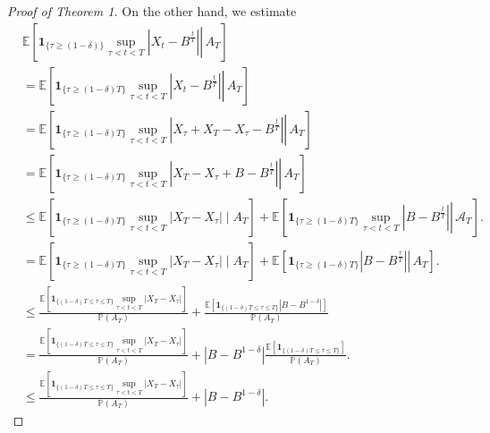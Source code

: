 \documentclass{article}
\theoremstyle{definition}
\theoremstyle{definition}
\begin{document}
\begin{proof}[Proof of Theorem 1]
On the other hand, we estimate
\begin{equation}\label{lol2}\begin{aligned}
& \mathbb{E}\left[\left.\mathbf{1}_{\{\tau \geq(1-\delta)\}} \sup _{\tau<t<T}\left|X_{t}-B^{\frac{t}{T}}\right| \right\rvert\, A_{T}\right] \\
& =\mathbb{E}\left[\left.\mathbf{1}_{\{\tau \geq(1-\delta) T\}} \sup _{\tau<t<T}\left|X_{t}-B^{\frac{t}{T}}\right| \right\rvert\, A_{T}\right] \\
& =\mathbb{E}\left[\left.\mathbf{1}_{\{\tau \geq(1-\delta) T\}} \sup _{\tau<t<T}\left|X_{\tau}+X_{T}-X_{\tau}-B^{\frac{t}{T}}\right| \right\rvert\, A_{T}\right] \\
& =\mathbb{E}\left[\left.\mathbf{1}_{\{\tau \geq(1-\delta) T\}} \sup _{\tau<t<T}\left|X_{T}-X_{\tau}+B-B^{\frac{t}{T}}\right| \right\rvert\, A_{T}\right] \\
& \leq \mathbb{E}\left[\mathbf{1}_{\{\tau \geq(1-\delta) T\}} \sup _{\tau<t<T}\left|X_{T}-X_{\tau}\right| \mid A_{T}\right]+\mathbb{E}\left[\left.\mathbf{1}_{\{\tau \geq(1-\delta) T\}} \sup _{\tau<t<T}\left|B-B^{\frac{t}{T}}\right| \right\rvert\, \mathcal{A}_{T}\right] . \\
& =\mathbb{E}\left[\mathbf{1}_{\{\tau \geq(1-\delta) T\}} \sup _{\tau<t<T}\left|X_{T}-X_{\tau}\right| \mid A_{T}\right]+\mathbb{E}\left[\left.\mathbf{1}_{\{\tau \geq(1-\delta) T\}}\left|B-B^{\frac{\tau}{T}}\right| \right\rvert\, A_{T}\right] . \\
& \leq \frac{\mathbb{E}\left[\mathbf{1}_{\{(1-\delta) T \leq \tau \leq T\}} \sup _{\tau<t<T}\left|X_{T}-X_{\tau}\right|\right]}{\mathbb{P}\left(A_{T}\right)}+\frac{\mathbb{E}\left[\mathbf{1}_{\{(1-\delta) T \leq \tau \leq T\}}\left|B-B^{1-\delta}\right|\right]}{\mathbb{P}\left(A_{T}\right)} \\
& =\frac{\mathbb{E}\left[\mathbf{1}_{\{(1-\delta) T \leq \tau \leq T\}} \sup _{\tau<t<T}\left|X_{T}-X_{\tau}\right|\right]}{\mathbb{P}\left(A_{T}\right)}+\left|B-B^{1-\delta}\right| \frac{\mathbb{E}\left[\mathbf{1}_{\{(1-\delta) T \leq \tau \leq T\}}\right]}{\mathbb{P}\left(A_{T}\right)} . \\
& \leq \frac{\mathbb{E}\left[\mathbf{1}_{\{(1-\delta) T \leq \tau \leq T\}} \sup _{\tau<t<T}\left|X_{T}-X_{\tau}\right|\right]}{\mathbb{P}\left(A_{T}\right)}+\left|B-B^{1-\delta}\right| .
\end{aligned}\end{equation}


\end{proof}
\end{document}
